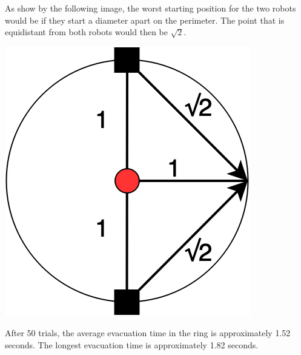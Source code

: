 \documentclass[12pt,letterpaper]{article}
\begin{document}
        As show by the following image, the worst starting position for the two robots would be if they start a diameter apart on the perimeter. The point that is equidistant from both robots would then be $\sqrt{2}$.
        
        \begin{center}
            \includegraphics[scale=0.3]{images/scenario-3-worstcase.png}
        \end{center}
        
        After 50 trials, the average evacuation time in the ring is approximately 1.52 seconds. The longest evacuation time is approximately 1.82 seconds.
\end{document}
